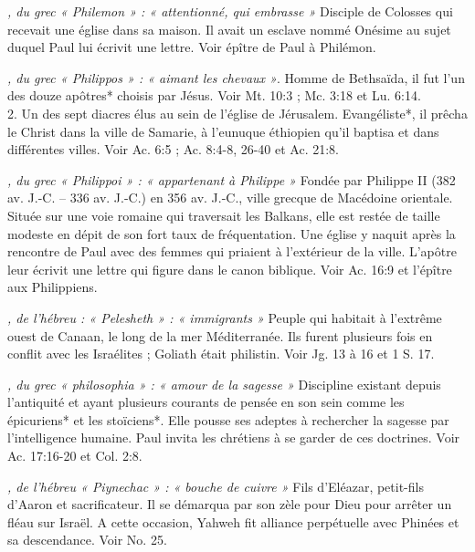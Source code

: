 \begin{multicols}{2}
{\textit{, du grec « Philemon » : « attentionné, qui embrasse »}\newline
Disciple de Colosses qui recevait une église dans sa maison. Il avait un esclave nommé Onésime au sujet duquel Paul lui écrivit une lettre. Voir épître de Paul à Philémon.

\textit{, du grec « Philippos » : « aimant les chevaux »}. Homme de Bethsaïda, il fut l'un des douze apôtres* choisis par Jésus. Voir Mt. 10:3 ; Mc. 3:18 et Lu. 6:14.
\\2. Un des sept diacres élus au sein de l'église de Jérusalem. Evangéliste*, il prêcha le Christ dans la ville de Samarie, à l'eunuque éthiopien qu'il baptisa et dans différentes villes. Voir Ac. 6:5 ; Ac. 8:4-8, 26-40 et Ac. 21:8.

\textit{, du grec « Philippoi » : « appartenant à Philippe »}\newline
Fondée par Philippe II (382 av. J.-C. – 336 av. J.-C.) en 356 av. J.-C., ville grecque de Macédoine orientale. Située sur une voie romaine qui traversait les Balkans, elle est restée de taille modeste en dépit de son fort taux de fréquentation. Une église y naquit après la rencontre de Paul avec des femmes qui priaient à l'extérieur de la ville. L'apôtre leur écrivit une lettre qui figure dans le canon biblique. Voir Ac. 16:9 et l'épître aux Philippiens.

\textit{, de l'hébreu : « Pelesheth » : « immigrants »}\newline
Peuple qui habitait à l'extrême ouest de Canaan, le long de la mer Méditerranée. Ils furent plusieurs fois en conflit avec les Israélites ; Goliath était philistin. Voir Jg. 13 à 16 et 1 S. 17.

\textit{, du grec « philosophia » : « amour de la sagesse »}\newline
Discipline existant depuis l'antiquité et ayant plusieurs courants de pensée en son sein comme les épicuriens* et les stoïciens*. Elle pousse ses adeptes à rechercher la sagesse par l'intelligence humaine. Paul invita les chrétiens à se garder de ces doctrines. Voir Ac. 17:16-20 et Col. 2:8.

\textit{, de l'hébreu « Piynechac » : « bouche de cuivre »}\newline
Fils d'Eléazar, petit-fils d'Aaron et sacrificateur. Il se démarqua par son zèle pour Dieu pour arrêter un fléau sur Israël. A cette occasion, Yahweh fit alliance perpétuelle avec Phinées et sa descendance. Voir No. 25.

}
\end{multicols}
